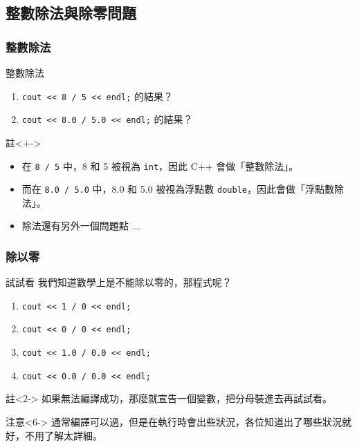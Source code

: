 \documentclass[utf8]{beamer}
\begin{document}
\begin{CJK}{UTF8}{bkai}
\subsection{整數除法與除零問題}

\begin{frame}[fragile]
  \frametitle{整數除法}
  \begin{block}{整數除法}
    \begin{enumerate}[<+->]
    \item \lstinline{cout << 8 / 5 << endl;}{} 的結果？
    \item \lstinline{cout << 8.0 / 5.0 << endl;}{} 的結果？
    \end{enumerate}
  \end{block}
  \begin{exampleblock}{註}<+->
    \begin{itemize}
    \item 在 \lstinline{8 / 5}{} 中，8 和 5 被視為 \lstinline{int}{}，因此 C++ 會做「\alert{整數除法}」。
    \item<+-> 而在 \lstinline{8.0 / 5.0}{} 中，8.0 和 5.0 被視為浮點數 \lstinline{double}{}，因此會做「\alert{浮點數除法}」。
    \end{itemize}
  \end{exampleblock}
  \begin{itemize}[<+->]
  \item 除法還有另外一個問題點 ...
  \end{itemize}
\end{frame}

\begin{frame}[fragile]
  \frametitle{除以零}
  \begin{block}{試試看}
    我們知道數學上是不能除以零的，那程式呢？
    \begin{enumerate}
    \item \lstinline{cout << 1 / 0 << endl;}{}
    \item<3-> \lstinline{cout << 0 / 0 << endl;}{}
    \item<4-> \lstinline{cout << 1.0 / 0.0 << endl;}{}
    \item<5-> \lstinline{cout << 0.0 / 0.0 << endl;}{}
    \end{enumerate}
  \end{block}
  \begin{exampleblock}{註}<2->
  如果無法編譯成功，那麼就宣告一個變數，把分母裝進去再試試看。
  \end{exampleblock}
  \begin{alertblock}{注意}<6->
  通常編譯可以過，但是在執行時會出些狀況，各位知道出了哪些狀況就好，不用了解太詳細。
  \end{alertblock}
\end{frame}


\end{CJK}
\end{document}
